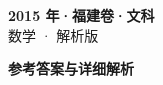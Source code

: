\documentclass[zihao=-4, a4paper]{ctexart}
\begin{document}
\begin{center}
  {\Large\bfseries 2015 年·福建卷·文科}\\[4pt]
  {\large 数学 · 解析版}
\end{center}
\medskip
{}

\clearpage
{}
\begin{center}{\Large\bfseries 参考答案与详细解析}\end{center}
\medskip

\end{document}
